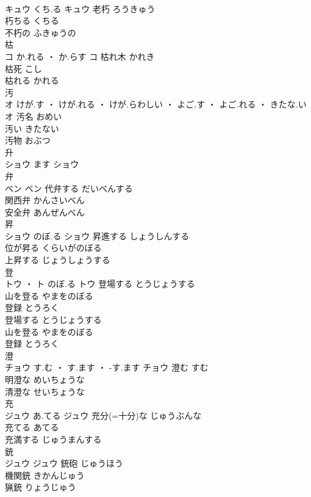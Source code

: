\documentclass[8pt]{extreport}
\begin{document}
\begin{CJK}{UTF8}{min}
\\	キュウ	くち.る	キュウ	老朽	ろうきゅう	
\\	朽ちる	くちる	
\\	不朽の	ふきゅうの	
\\	枯	
\\	コ	か.れる ・ か.らす	コ	枯れ木	かれき	
\\	枯死	こし	
\\	枯れる	かれる	
\\	汚	
\\	オ	けが.す ・ けが.れる ・ けが.らわしい ・ よご.す ・ よご.れる ・ きたな.い	オ	汚名	おめい	
\\	汚い	きたない	
\\	汚物	おぶつ	
\\	升	
\\	ショウ	ます	ショウ																																			
\\	弁	
\\	ベン		ベン	代弁する	だいべんする	
\\	関西弁	かんさいべん	
\\	安全弁	あんぜんべん	
\\	昇	
\\	ショウ	のぼ.る	ショウ	昇進する	しょうしんする	
\\	位が昇る	くらいがのぼる	
\\	上昇する	じょうしょうする	
\\	登	
\\	トウ ・ ト	のぼ.る	トウ	登場する	とうじょうする	
\\	山を登る	やまをのぼる	
\\	登録	とうろく	
\\	登場する	とうじょうする	
\\	山を登る	やまをのぼる	
\\	登録	とうろく	
\\	澄	
\\	チョウ	す.む ・ す.ます ・ -す.ます	チョウ	澄む	すむ	
\\	明澄な	めいちょうな	
\\	清澄な	せいちょうな	
\\	充	
\\	ジュウ	あ.てる	ジュウ	充分(=十分)な	じゅうぶんな	
\\	充てる	あてる	
\\	充満する	じゅうまんする	
\\	銃	
\\	ジュウ		ジュウ	銃砲	じゅうほう	
\\	機関銃	きかんじゅう	
\\	猟銃	りょうじゅう	

\end{CJK}
\end{document}
